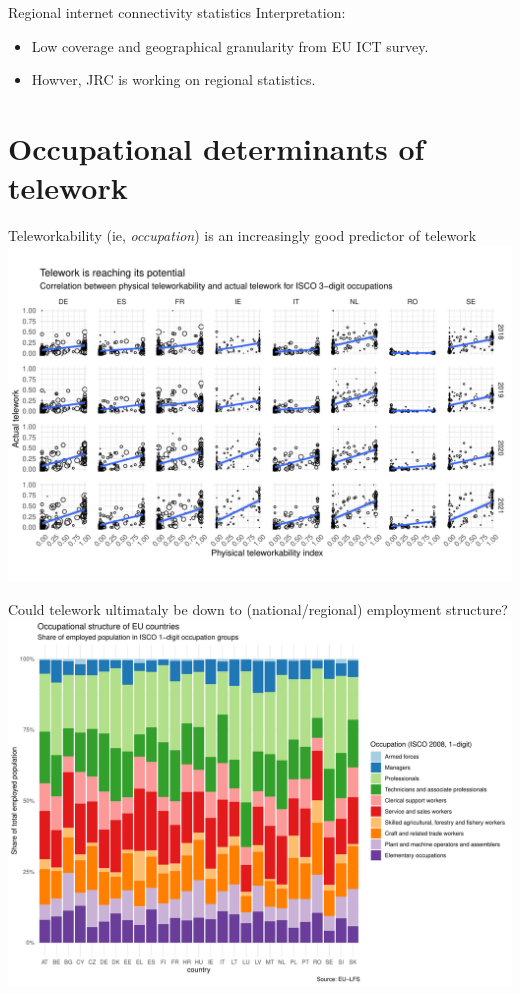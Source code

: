 \documentclass[10pt,handout]{beamer}
\begin{document}
\begin{frame}{Regional internet connectivity statistics}
Interpretation:
\begin{itemize}
\item Low coverage and geographical granularity from EU ICT survey.
\item Howver, JRC is working on regional statistics.
\end{itemize}
\end{frame}

\section{Occupational determinants of telework}

\begin{frame}{Teleworkability (ie, \emph{occupation}) is an increasingly good predictor of telework}
\pause
\centering
\includegraphics[width=\textwidth,height=0.9\textheight,keepaspectratio]{Correlation_teleworkability_telework_selected.pdf}
\end{frame}


\begin{frame}{Could telework ultimataly be down to (national/regional) employment structure?}
\pause
\centering
\includegraphics[width=\textwidth,height=0.9\textheight,keepaspectratio]{LFS_occup_structure.pdf}
\end{frame}
\end{document}
